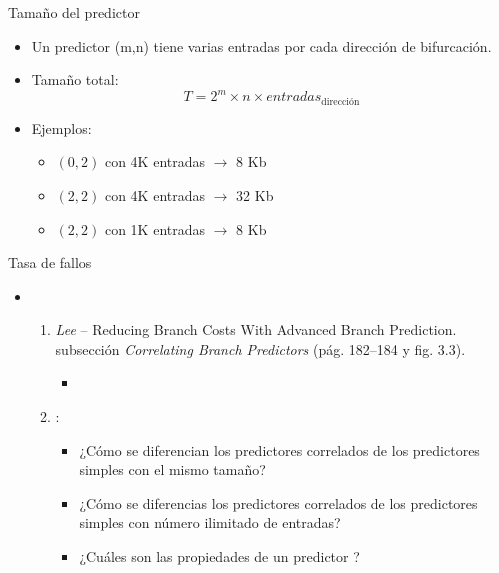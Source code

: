 \begin{frame}[t]{Tamaño del predictor}
\begin{itemize}
  \item Un predictor (m,n) tiene varias entradas por cada dirección de
        bifurcación.

  \item Tamaño total:
\[
T = 2^m \times n \times entradas_{\text{dirección}}
\]

  \item Ejemplos:
    \begin{itemize}
      \item $(0,2)$ con 4K entradas $\rightarrow$ 8 Kb
      \item $(2,2)$ con 4K entradas $\rightarrow$ 32 Kb
      \item $(2,2)$ con 1K entradas $\rightarrow$ 8 Kb
   \end{itemize}
\end{itemize}
\end{frame}

\begin{frame}[t]{Tasa de fallos}
\begin{itemize}
  \item {}
    \begin{enumerate}
      \item \emph{Lee}  -- 
            Reducing Branch Costs With Advanced Branch Prediction.\\
             subsección \emph{Correlating Branch Predictors}
            (pág. 182--184 y fig. 3.3).
        \begin{itemize}
          \item \bibhennessy
        \end{itemize}

      \item {}:
        \begin{itemize}
          \item ¿Cómo se diferencian los predictores correlados de los predictores simples
                con el mismo tamaño?
          \item ¿Cómo se diferencias los predictores correlados de los predictores simples
                con número ilimitado de entradas?
          \item ¿Cuáles son las propiedades de un predictor ?
        \end{itemize}
    \end{enumerate}
\end{itemize}
\end{frame}


